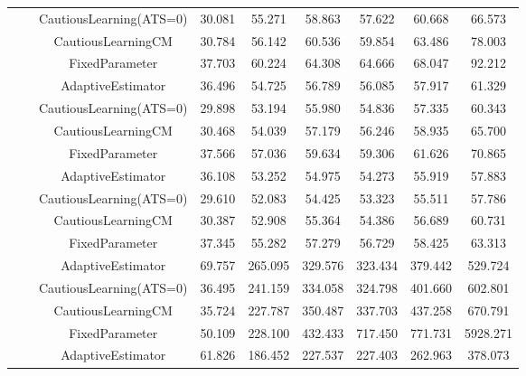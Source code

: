 \begin{table}[!h]
\begin{tabular}[t]{ccccccccc}
 &  & CautiousLearning(ATS=0) & 30.081 & 55.271 & 58.863 & 57.622 & 60.668 & 66.573\\

 &  & CautiousLearningCM & 30.784 & 56.142 & 60.536 & 59.854 & 63.486 & 78.003\\

 & \multirow[t]{-4}{*}{\centering\arraybackslash 1.00} & FixedParameter & 37.703 & 60.224 & 64.308 & 64.666 & 68.047 & 92.212\\
\cmidrule{2-9}
 &  & AdaptiveEstimator & 36.496 & 54.725 & 56.789 & 56.085 & 57.917 & 61.329\\

 &  & CautiousLearning(ATS=0) & 29.898 & 53.194 & 55.980 & 54.836 & 57.335 & 60.343\\

 &  & CautiousLearningCM & 30.468 & 54.039 & 57.179 & 56.246 & 58.935 & 65.700\\

 & \multirow[t]{-4}{*}{\centering\arraybackslash 1.25} & FixedParameter & 37.566 & 57.036 & 59.634 & 59.306 & 61.626 & 70.865\\
\cmidrule{2-9}
 &  & AdaptiveEstimator & 36.108 & 53.252 & 54.975 & 54.273 & 55.919 & 57.883\\

 &  & CautiousLearning(ATS=0) & 29.610 & 52.083 & 54.425 & 53.323 & 55.511 & 57.786\\

 &  & CautiousLearningCM & 30.387 & 52.908 & 55.364 & 54.386 & 56.689 & 60.731\\

\multirow[t]{-28}{*}{\centering\arraybackslash 50} & \multirow[t]{-4}{*}{\centering\arraybackslash 1.50} & FixedParameter & 37.345 & 55.282 & 57.279 & 56.729 & 58.425 & 63.313\\
\cmidrule{1-9}
 &  & AdaptiveEstimator & 69.757 & 265.095 & 329.576 & 323.434 & 379.442 & 529.724\\

 &  & CautiousLearning(ATS=0) & 36.495 & 241.159 & 334.058 & 324.798 & 401.660 & 602.801\\

 &  & CautiousLearningCM & 35.724 & 227.787 & 350.487 & 337.703 & 437.258 & 670.791\\

 & \multirow[t]{-4}{*}{\centering\arraybackslash 0.25} & FixedParameter & 50.109 & 228.100 & 432.433 & 717.450 & 771.731 & 5928.271\\
\cmidrule{2-9}
 &  & AdaptiveEstimator & 61.826 & 186.452 & 227.537 & 227.403 & 262.963 & 378.073\\


\end{tabular}
\end{table}
